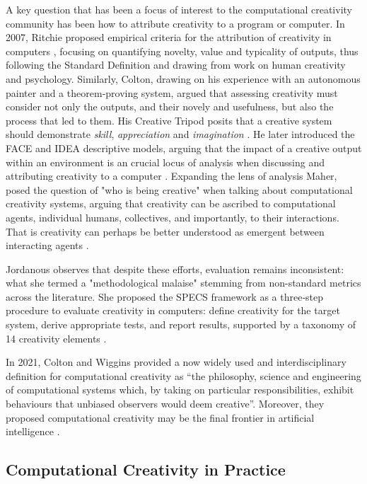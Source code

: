 A key question that has been a focus of interest to the computational creativity community has been how to attribute creativity to a program or computer. In 2007, Ritchie proposed empirical criteria for the attribution of creativity in computers \cite{Ritchie2007-jy}, focusing on quantifying novelty, value and typicality of outputs, thus following the Standard Definition and drawing from work on human creativity and psychology. Similarly, Colton, drawing on his experience with an autonomous painter and a theorem‑proving system, argued that assessing creativity must consider not only the outputs, and their novely and usefulness, but also the process that led to them. His Creative Tripod posits that a creative system should demonstrate \textit{skill}, \textit{appreciation} and \textit{imagination} \cite{Colton2008-fh}. He later introduced the FACE and IDEA descriptive models, arguing that the impact of a creative output within an environment is an crucial locus of analysis when discussing and attributing creativity to a computer \cite{Colton2011-uy}. Expanding the lens of analysis Maher, posed the question of "who is being creative" when talking about computational creativity systems, arguing that creativity can be ascribed to computational agents, individual humans, collectives, and importantly, to their interactions. That is creativity can perhaps be better understood as emergent between interacting agents \cite{Maher2012-oj}. 

Jordanous observes that despite these efforts, evaluation remains inconsistent: what she termed a "methodological malaise" stemming from non-standard metrics across the literature. She proposed the SPECS framework as a three‑step procedure to evaluate creativity in computers: define creativity for the target system, derive appropriate tests, and report results, supported by a taxonomy of 14 creativity elements \cite{Jordanous2012-kw}.

In 2021, Colton and Wiggins provided a now widely used and interdisciplinary definition for computational creativity as “the philosophy, science and engineering of computational systems which, by taking on particular responsibilities, exhibit behaviours that unbiased observers would deem creative”. Moreover, they proposed computational creativity may be the final frontier in artificial intelligence \cite{Colton2021-bt}. 

\subsection{Computational Creativity in Practice}

